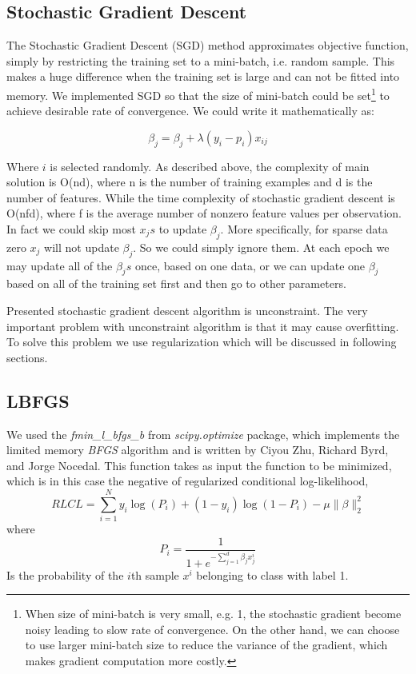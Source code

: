 \documentclass[twoside,12pt]{article}
\begin{document}
\subsection{Stochastic Gradient Descent}
The Stochastic Gradient Descent (SGD) method approximates objective function, simply by restricting the training set to a mini-batch, i.e. random sample. 
This makes a huge difference when the training set is large and can not be fitted into memory. We implemented SGD so that the size of mini-batch could be set\footnote{When size of mini-batch is very small, e.g. 1, the stochastic gradient become noisy leading to slow rate of convergence. On the other hand, we can choose to use larger mini-batch size to reduce the variance of the gradient, which makes gradient computation more costly.} to achieve desirable rate of convergence. We could write it mathematically as:

\begin{equation}
\beta_j=\beta_j+\lambda (y_i-p_i)x_{ij}
\end{equation}

Where $i$ is selected randomly. As described above, the complexity of main solution is O(nd), where n is the number of training examples and d is the number of features. While the time complexity of stochastic gradient descent is O(nfd), where f is the average number of nonzero feature values per observation. In fact we could skip most $x_js$ to update $\beta_j$. More specifically, for sparse data zero $x_j$ will not update $\beta_j$. So we could simply ignore them. At each epoch we may update all of the $\beta_js$ once, based on one data, or we can update one $\beta_j$ based on all of the training set first and then go to other parameters.

Presented stochastic gradient descent algorithm is unconstraint. The very important problem with unconstraint algorithm is that it may cause overfitting. To solve this problem we use regularization which will be discussed in following sections.
\subsection{LBFGS}
We used the {\it fmin\_l\_bfgs\_b} from { \it scipy.optimize} package, which implements the limited memory {\it BFGS} algorithm and is written by Ciyou Zhu, Richard Byrd, and Jorge Nocedal. This function takes as input the function to be minimized, which is in this case the negative of regularized conditional log-likelihood,
\begin{equation}
RLCL = \sum_{i=1}^N y_i \log(P_i) + (1-y_i)\log(1 - P_i) - \mu \|\beta\|_2^2
\end{equation}
where 
\begin{equation}
P_i = \frac{1}{1+e^{-\sum_{j=1}^d \beta_j x^i_j}}
\end{equation}
Is the probability of the $i$th sample $x^i$ belonging to class with label 1. 
\end{document}
